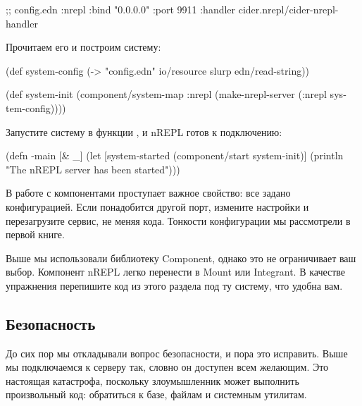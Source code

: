 \begin{english}
  \begin{clojure}
;; config.edn
{:nrepl {:bind "0.0.0.0"
         :port 9911
         :handler cider.nrepl/cider-nrepl-handler}}
  \end{clojure}
\end{english}

Прочитаем его и построим систему:

\begin{english}
  \begin{clojure}
(def system-config
  (-> "config.edn"
      io/resource
      slurp
      edn/read-string))

(def system-init
  (component/system-map
   :nrepl (make-nrepl-server (:nrepl system-config))))
  \end{clojure}
\end{english}

Запустите систему в функции  , и nREPL готов к подключению:

\begin{english}
  \begin{clojure}
(defn -main
  [& _]
  (let [system-started
        (component/start system-init)]
    (println "The nREPL server has been started")))
  \end{clojure}
\end{english}

В работе с компонентами проступает важное свойство: все задано конфигурацией. Если понадобится другой порт, измените настройки и перезагрузите сервис, не меняя кода. Тонкости конфигурации мы рассмотрели в первой книге.

Выше мы использовали библиотеку Component, однако это не ограничивает ваш выбор. Компонент nREPL легко перенести в Mount или Integrant. В качестве упражнения перепишите код из этого раздела под ту систему, что удобна вам.

\subsection{Безопасность}

До сих пор мы откладывали вопрос безопасности, и пора это исправить. Выше мы подключаемся к серверу так, словно он доступен всем желающим. Это настоящая катастрофа, поскольку злоумышленник может выполнить произвольный код: обратиться к базе, файлам и системным утилитам.

\def\urlportscan{https://en.wikipedia.org/wiki/Port\_scanner}

